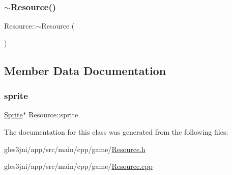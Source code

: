 \subsubsection{\texorpdfstring{$\sim$\+Resource()}{~Resource()}}
{\footnotesize\ttfamily Resource\+::$\sim$\+Resource (\begin{DoxyParamCaption}{ }\end{DoxyParamCaption})}



\subsection{Member Data Documentation}
\mbox{\label{class_resource_a786b65335656d3d4e9bebe44a6eeed5e}} 
\subsubsection{\texorpdfstring{sprite}{sprite}}
{\footnotesize\ttfamily \hyperlink{class_sprite}{Sprite}$\ast$ Resource\+::sprite\hspace{0.3cm}{\ttfamily [private]}}



The documentation for this class was generated from the following files\+:\begin{DoxyCompactItemize}
\item 
gles3jni/app/src/main/cpp/game/\hyperlink{_resource_8h}{Resource.\+h}\item 
gles3jni/app/src/main/cpp/game/\hyperlink{_resource_8cpp}{Resource.\+cpp}\end{DoxyCompactItemize}
